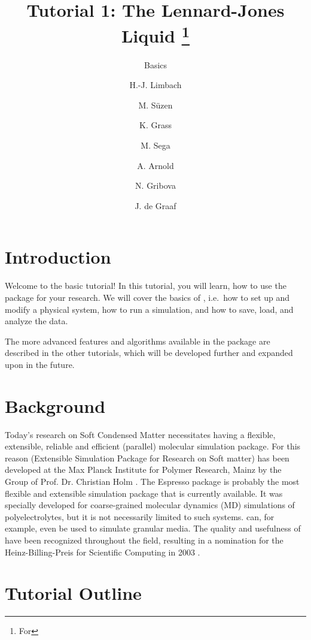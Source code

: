 \documentclass[
paper=a4,                       %
fontsize=11pt,                  %
twoside,                        %
footsepline,                    %
headsepline,                    %
headinclude=false,              %
footinclude=false,              %
pagesize,                       %
]{scrartcl}
\begin{document}
\esptitlehead

\title{Tutorial 1: The Lennard-Jones Liquid%
\ifdefined\esversion%
\thanks{For \es \esversion}%
\fi%
}
\subtitle{\es Basics}
\author{H.-J. Limbach \and M. S\"uzen \and K. Grass \and M. Sega \and A. Arnold \and N. Gribova \and J. de Graaf}
\maketitle
\tableofcontents

\section{Introduction}

Welcome to the basic \es{} tutorial! In this tutorial, you will learn, how to use the \es{} package for your research. We will cover the basics of \es, i.e.~how to set up and modify a physical system, how to run a simulation, and how to save, load, and analyze the data.

The more advanced features and algorithms available in the \es{} package are described in the other tutorials, which will be developed further and expanded upon in the future.

\section{Background}

Today's research on Soft Condensed Matter necessitates having a flexible, extensible, reliable and efficient (parallel) molecular simulation package. For this reason \es{} (Extensible Simulation Package for Research on Soft matter) \cite{esp_url} has been developed at the Max Planck Institute for Polymer Research, Mainz by the Group of Prof. Dr. Christian Holm \cite{limbach2006ees}. The Espresso package is probably the most flexible and extensible simulation package that is currently available. It was specially developed for coarse-grained molecular dynamics (MD) simulations of polyelectrolytes, but it is not necessarily limited to such systems. \es{} can, for example, even be used to simulate granular media. The quality and usefulness of \es{} have been recognized throughout the field, resulting in a nomination for the Heinz-Billing-Preis for Scientific Computing in 2003 \cite{arnold2003ees}.

\section{Tutorial Outline}
\end{document}

